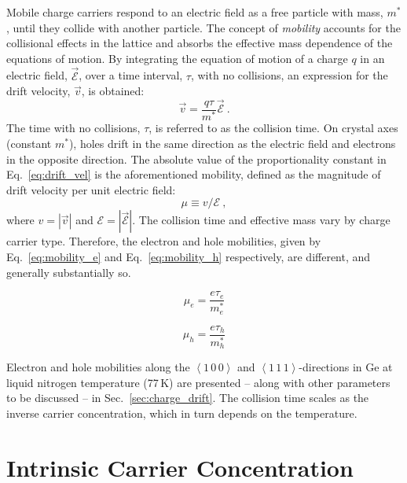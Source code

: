 Mobile charge carriers respond to an electric field as a free particle with mass, $m^*$, until they collide with another particle. The concept of \textit{mobility} accounts for the collisional effects in the lattice and absorbs the effective mass dependence of the equations of motion. By integrating the equation of motion of a charge $q$ in an electric field, $\vec{\mathcal{E}}$,  over a time interval, $\tau$, with no collisions, an expression for the drift velocity, $\vec{v}$, is obtained:
\begin{equation}
	\vec{v} = \frac{q\tau}{m^*}\vec{\mathcal{E}}~.
 	\label{eq:drift_vel}
\end{equation}
The time with no collisions, $\tau$, is referred to as the collision time. On crystal axes (constant $m^*$), holes drift in the same direction as the electric field and electrons in the opposite direction. The absolute value of the proportionality constant in Eq.~\ref{eq:drift_vel} is the aforementioned mobility, defined as the magnitude of drift velocity per unit electric field: 
\begin{equation}
	\mu \equiv v/\mathcal{E}~,
	\label{eq:mobility}
\end{equation}
where $v = \left|\vec{v}\right|$ and $\mathcal{E} = \left|\vec{\mathcal{E}}\right|$. The collision time and effective mass vary by charge carrier type. Therefore, the electron and hole mobilities, given by Eq.~\ref{eq:mobility_e} and Eq.~\ref{eq:mobility_h} respectively, are different, and generally substantially so.
\vspace{-0.5\baselineskip} 
\begin{multicols}{2}
	\begin{equation}
		\mu_e = \frac{e\tau_e}{m_e^*}
	\label{eq:mobility_e}
	\end{equation}

	\begin{equation}
		\mu_h = \frac{e\tau_h}{m_h^*}
	\label{eq:mobility_h}
	\end{equation}
\end{multicols}
\noindent Electron and hole mobilities along the $\left<1\,0\,0\right>$ and $\left<1\,1\,1\right>$-directions in Ge at liquid nitrogen temperature (77\,K) are presented -- along with other parameters to be discussed -- in Sec.~\ref{sec:charge_drift}. The collision time scales as the inverse carrier concentration, which in turn depends on the temperature.

\section{Intrinsic Carrier Concentration}

